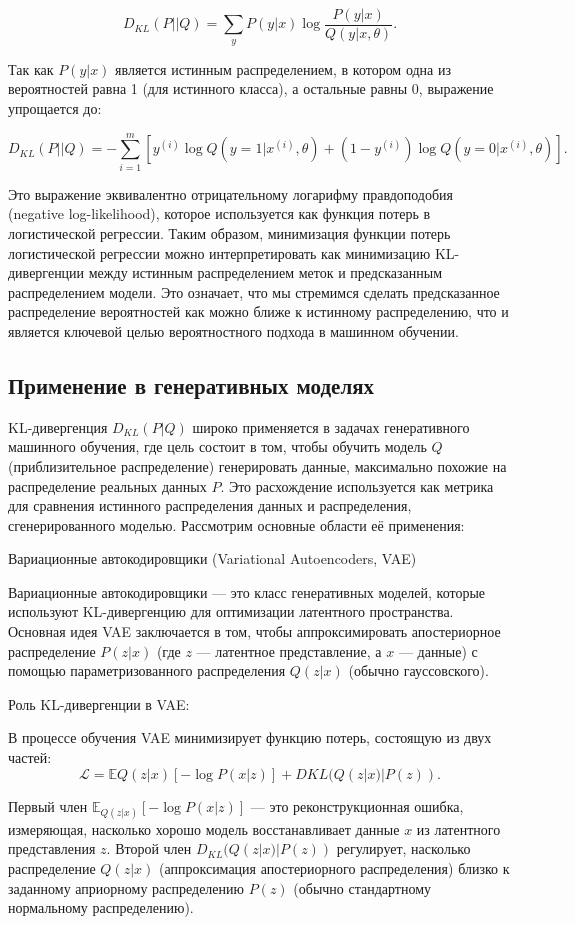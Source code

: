 \[
D_{KL}(P || Q) = \sum_{y} P(y|x) \log \frac{P(y|x)}{Q(y|x, \theta)}.
\]

Так как $P(y|x)$ является истинным распределением, в котором одна из вероятностей равна 1 (для истинного класса), а остальные равны 0, выражение упрощается до:

\[
D_{KL}(P || Q) = - \sum_{i=1}^m \left[ y^{(i)} \log Q(y=1|x^{(i)}, \theta) + (1 - y^{(i)}) \log Q(y=0|x^{(i)}, \theta) \right].
\]

Это выражение эквивалентно отрицательному логарифму правдоподобия (negative log-likelihood), которое используется как функция потерь в логистической регрессии. Таким образом, минимизация функции потерь логистической регрессии можно интерпретировать как минимизацию KL-дивергенции между истинным распределением меток и предсказанным распределением модели. Это означает, что мы стремимся сделать предсказанное распределение вероятностей как можно ближе к истинному распределению, что и является ключевой целью вероятностного подхода в машинном обучении.


\subsection*{Применение в генеративных моделях}
KL-дивергенция $D_{KL}(P | Q)$ широко применяется в задачах генеративного машинного обучения, где цель состоит в том, чтобы обучить модель $ Q $ (приблизительное распределение) генерировать данные, максимально похожие на распределение реальных данных $P$. Это расхождение используется как метрика для сравнения истинного распределения данных и распределения, сгенерированного моделью. Рассмотрим основные области её применения:

 Вариационные автокодировщики (Variational Autoencoders, VAE)

Вариационные автокодировщики — это класс генеративных моделей, которые используют KL-дивергенцию для оптимизации латентного пространства. Основная идея VAE заключается в том, чтобы аппроксимировать апостериорное распределение $ P(z|x) $ (где $ z $ — латентное представление, а $ x $ — данные) с помощью параметризованного распределения $Q(z|x)$ (обычно гауссовского).

Роль KL-дивергенции в VAE:

В процессе обучения VAE минимизирует функцию потерь, состоящую из двух частей:
\[
\mathcal{L} = \mathbb{E}{Q(z|x)}[-\log P(x|z)] + D{KL}(Q(z|x) | P(z)).
\]

    Первый член $\mathbb{E}_{Q(z|x)}[-\log P(x|z)]$ — это реконструкционная ошибка, измеряющая, насколько хорошо модель восстанавливает данные  $x$ из латентного представления $z$.
    Второй член $D_{KL}(Q(z|x) | P(z))$ регулирует, насколько распределение $Q(z|x)$ (аппроксимация апостериорного распределения) близко к заданному априорному распределению $ P(z) $ (обычно стандартному нормальному распределению).

